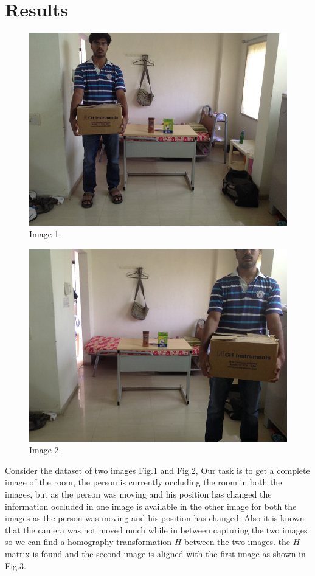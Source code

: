\documentclass[conference]{IEEEtran}
\begin{document}
\section{Results}
\begin{figure}
  \includegraphics[width=\linewidth]{img1.jpg}
  \caption{Image 1.}
  \label{fig:i1}
\end{figure}
\begin{figure}
  \includegraphics[width=\linewidth]{img2.jpg}
  \caption{Image 2.}
  \label{fig:i2}
\end{figure}
	Consider the dataset of two images Fig.1 and Fig.2, Our task is to get a complete image of the room, the person is currently occluding the room in both the images, but as the person was moving and his position has changed the information occluded in one image is available in the other image for both the images as the person was moving and his position has changed. Also it is known that the camera was not moved much while in between capturing the two images so we can find a homography transformation $H$ between the two images. the $H$ matrix is found and the second image is aligned with the first image as shown in Fig.3.
\end{document}
